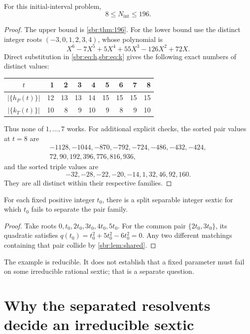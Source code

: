 \documentclass[11pt,letterpaper]{article}
\numberwithin{equation}{section}
\theoremstyle{definition}
\theoremstyle{remark}
\begin{document}
\begin{proposition}
\label{sbr:prop:integer-lower}
For this initial-interval problem,
\begin{equation}
 8\le N_{\mathrm{int}}\le196.
\end{equation}
\end{proposition}
\begin{proof}
The upper bound is \cref{sbr:thm:196}. For the lower bound use the distinct
integer roots $(-3,0,1,2,3,4)$, whose polynomial is
\[
 X^6-7X^5+5X^4+55X^3-126X^2+72X.
\]
Direct substitution in \cref{sbr:eq:h,sbr:eq:k} gives the following exact numbers
of distinct values:
\begin{center}
\begin{tabular}{c*{8}{r}}
\toprule
$t$&1&2&3&4&5&6&7&8\\
\midrule
$|\{h_P(t)\}|$&12&13&13&14&15&15&15&15\\
$|\{k_T(t)\}|$&10&8&9&10&9&8&9&10\\
\bottomrule
\end{tabular}
\end{center}
Thus none of $1,\ldots,7$ works. For additional explicit checks, the sorted
pair values at $t=8$ are
\[
\begin{gathered}
-1128,-1044,-870,-792,-724,-486,-432,-424,\\
72,90,192,396,776,816,936,
\end{gathered}
\]
and the sorted triple values are
\[
 -32,-28,-22,-20,-14,1,32,46,92,160.
\]
They are all distinct within their respective families.
\end{proof}

\begin{proposition}
\label{sbr:prop:no-single}
For each fixed positive integer $t_0$, there is a split separable integer
sextic for which $t_0$ fails to separate the pair family.
\end{proposition}
\begin{proof}
Take roots $0,t_0,2t_0,3t_0,4t_0,5t_0$. For the common pair
$\{2t_0,3t_0\}$, its quadratic satisfies
$q(t_0)=t_0^2+5t_0^2-6t_0^2=0$. Any two different matchings containing
that pair collide by \cref{sbr:lem:shared}.
\end{proof}
The example is reducible. It does not establish that a fixed parameter
must fail on some irreducible rational sextic; that is a separate question.

\section{Why the separated resolvents decide an irreducible sextic}
\label{sbr:sec:galois}
\end{document}
